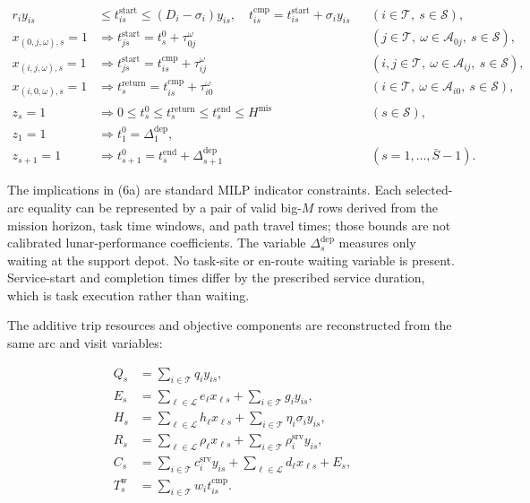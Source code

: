 \documentclass[
  11pt,
]{article}
\begin{document}
\[
\begin{aligned}
r_i y_{is}
&\le t_{is}^{\mathrm{start}}
\le (D_i-\sigma_i)y_{is},
\quad
t_{is}^{\mathrm{cmp}}
=t_{is}^{\mathrm{start}}+\sigma_i y_{is}
&& (i\in\mathcal{T},\ s\in\mathcal{S}),\\
x_{(0,j,\omega),s}=1
&\Rightarrow
t_{js}^{\mathrm{start}}=t_s^0+\tau_{0j}^{\omega}
&& (j\in\mathcal{T},\ \omega\in\mathcal{A}_{0j},\
s\in\mathcal{S}),\\
x_{(i,j,\omega),s}=1
&\Rightarrow
t_{js}^{\mathrm{start}}=
t_{is}^{\mathrm{cmp}}+\tau_{ij}^{\omega}
&& (i,j\in\mathcal{T},\ \omega\in\mathcal{A}_{ij},\
s\in\mathcal{S}),\\
x_{(i,0,\omega),s}=1
&\Rightarrow
t_s^{\mathrm{return}}=
t_{is}^{\mathrm{cmp}}+\tau_{i0}^{\omega}
&& (i\in\mathcal{T},\ \omega\in\mathcal{A}_{i0},\
s\in\mathcal{S}),\\
z_s=1
&\Rightarrow
0\le t_s^0\le t_s^{\mathrm{return}}
\le t_s^{\mathrm{end}}\le H^{\mathrm{mis}}
&& (s\in\mathcal{S}),\\
z_1=1
&\Rightarrow
t_1^0=\Delta_1^{\mathrm{dep}},\\
z_{s+1}=1
&\Rightarrow
t_{s+1}^0=t_s^{\mathrm{end}}+\Delta_{s+1}^{\mathrm{dep}}
&& (s=1,\ldots,\bar S-1).
\end{aligned}
\tag{6a}
\]

The implications in (6a) are standard MILP indicator constraints. Each
selected-arc equality can be represented by a pair of valid big-\(M\)
rows derived from the mission horizon, task time windows, and path
travel times; those bounds are not calibrated lunar-performance
coefficients. The variable \(\Delta_s^{\mathrm{dep}}\) measures only
waiting at the support depot. No task-site or en-route waiting variable
is present. Service-start and completion times differ by the prescribed
service duration, which is task execution rather than waiting.

The additive trip resources and objective components are reconstructed
from the same arc and visit variables:

\[
\begin{aligned}
Q_s&=\sum_{i\in\mathcal{T}}q_i y_{is},\\
E_s&=\sum_{\ell\in\mathcal{L}}e_\ell x_{\ell s}
     +\sum_{i\in\mathcal{T}}g_i y_{is},\\
H_s&=\sum_{\ell\in\mathcal{L}}h_\ell x_{\ell s}
     +\sum_{i\in\mathcal{T}}\eta_i\sigma_i y_{is},\\
R_s&=\sum_{\ell\in\mathcal{L}}\rho_\ell x_{\ell s}
     +\sum_{i\in\mathcal{T}}\rho_i^{\mathrm{srv}}y_{is},\\
C_s&=\sum_{i\in\mathcal{T}}c_i^{\mathrm{srv}}y_{is}
     +\sum_{\ell\in\mathcal{L}}d_\ell x_{\ell s}+E_s,\\
T_s^{\mathrm{w}}
&=\sum_{i\in\mathcal{T}}w_i t_{is}^{\mathrm{cmp}} .
\end{aligned}
\tag{6b}
\]
\end{document}
